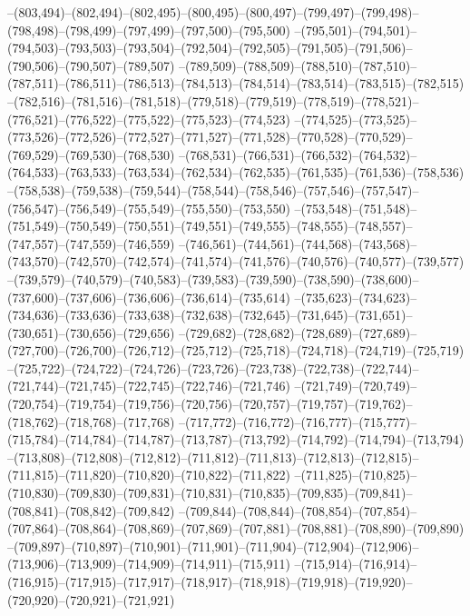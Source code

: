 --(803,494)--(802,494)--(802,495)--(800,495)--(800,497)--(799,497)--(799,498)--(798,498)--(798,499)--(797,499)--(797,500)--(795,500)
--(795,501)--(794,501)--(794,503)--(793,503)--(793,504)--(792,504)--(792,505)--(791,505)--(791,506)--(790,506)--(790,507)--(789,507)
--(789,509)--(788,509)--(788,510)--(787,510)--(787,511)--(786,511)--(786,513)--(784,513)--(784,514)--(783,514)--(783,515)--(782,515)
--(782,516)--(781,516)--(781,518)--(779,518)--(779,519)--(778,519)--(778,521)--(776,521)--(776,522)--(775,522)--(775,523)--(774,523)
--(774,525)--(773,525)--(773,526)--(772,526)--(772,527)--(771,527)--(771,528)--(770,528)--(770,529)--(769,529)--(769,530)--(768,530)
--(768,531)--(766,531)--(766,532)--(764,532)--(764,533)--(763,533)--(763,534)--(762,534)--(762,535)--(761,535)--(761,536)--(758,536)
--(758,538)--(759,538)--(759,544)--(758,544)--(758,546)--(757,546)--(757,547)--(756,547)--(756,549)--(755,549)--(755,550)--(753,550)
--(753,548)--(751,548)--(751,549)--(750,549)--(750,551)--(749,551)--(749,555)--(748,555)--(748,557)--(747,557)--(747,559)--(746,559)
--(746,561)--(744,561)--(744,568)--(743,568)--(743,570)--(742,570)--(742,574)--(741,574)--(741,576)--(740,576)--(740,577)--(739,577)
--(739,579)--(740,579)--(740,583)--(739,583)--(739,590)--(738,590)--(738,600)--(737,600)--(737,606)--(736,606)--(736,614)--(735,614)
--(735,623)--(734,623)--(734,636)--(733,636)--(733,638)--(732,638)--(732,645)--(731,645)--(731,651)--(730,651)--(730,656)--(729,656)
--(729,682)--(728,682)--(728,689)--(727,689)--(727,700)--(726,700)--(726,712)--(725,712)--(725,718)--(724,718)--(724,719)--(725,719)
--(725,722)--(724,722)--(724,726)--(723,726)--(723,738)--(722,738)--(722,744)--(721,744)--(721,745)--(722,745)--(722,746)--(721,746)
--(721,749)--(720,749)--(720,754)--(719,754)--(719,756)--(720,756)--(720,757)--(719,757)--(719,762)--(718,762)--(718,768)--(717,768)
--(717,772)--(716,772)--(716,777)--(715,777)--(715,784)--(714,784)--(714,787)--(713,787)--(713,792)--(714,792)--(714,794)--(713,794)
--(713,808)--(712,808)--(712,812)--(711,812)--(711,813)--(712,813)--(712,815)--(711,815)--(711,820)--(710,820)--(710,822)--(711,822)
--(711,825)--(710,825)--(710,830)--(709,830)--(709,831)--(710,831)--(710,835)--(709,835)--(709,841)--(708,841)--(708,842)--(709,842)
--(709,844)--(708,844)--(708,854)--(707,854)--(707,864)--(708,864)--(708,869)--(707,869)--(707,881)--(708,881)--(708,890)--(709,890)
--(709,897)--(710,897)--(710,901)--(711,901)--(711,904)--(712,904)--(712,906)--(713,906)--(713,909)--(714,909)--(714,911)--(715,911)
--(715,914)--(716,914)--(716,915)--(717,915)--(717,917)--(718,917)--(718,918)--(719,918)--(719,920)--(720,920)--(720,921)--(721,921)
